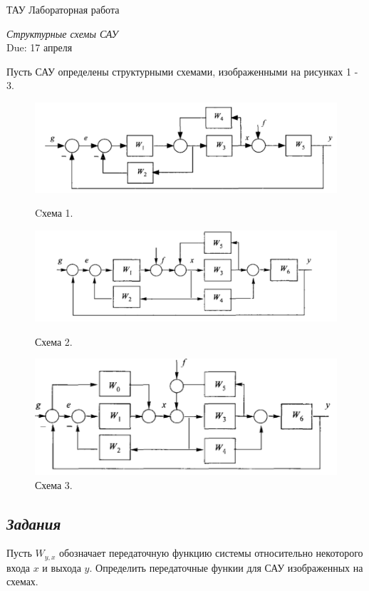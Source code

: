 \documentclass[a4paper,oneside,10pt]{book}
\theoremstyle{definition}
\begin{document}
\begin{center}
	{\large  ТАУ \hspace{0.1cm} Лабораторная работа }

	\vspace{5pt}
	\textit{\large Структурные схемы САУ}\\ %
	\vspace{10pt}
	Due: 17 апреля %
\end{center}

\vspace{0.2 cm}



Пусть САУ определены структурными схемами, изображенными на рисунках 1 - 3.


\begin{figure}[h]
	\centering
	\includegraphics[width=0.7\linewidth]{1.PNG}
	\caption{Cхема 1.}

	\includegraphics[width=0.7\linewidth]{2.PNG}
	\caption{Схема 2.}

	\includegraphics[width=0.6\linewidth]{3.PNG}
	\caption{Схема 3.}
\end{figure}

\subsection*{\textit{Задания}}
Пусть $W_{y, x}$ обозначает передаточную функцию системы  относительно некоторого входа $x$ и выхода $y$.
Определить передаточные функии для САУ изображенных на схемах.
\end{document}

